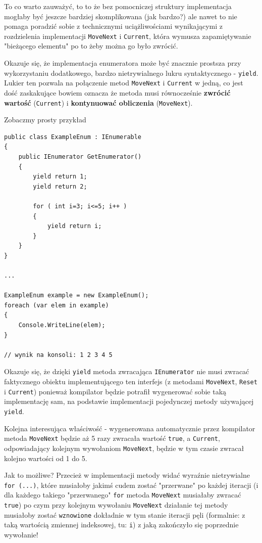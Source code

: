 To co warto zauważyć, to to że bez pomocniczej struktury implementacja mogłaby być jeszcze bardziej
skomplikowana (jak bardzo?) ale nawet to nie pomaga poradzić sobie z technicznymi uciążliwościami wynikającymi
z rozdzielenia implementacji {\tt MoveNext} i {\tt Current}, która wymusza zapamiętywanie "bieżącego elementu"
po to żeby można go było zwrócić.

Okazuje się, że implementacja enumeratora może być znacznie prostsza przy wykorzystaniu dodatkowego,
bardzo nietrywialnego lukru syntaktycznego - {\tt yield}. Lukier ten pozwala na połączenie
metod {\tt MoveNext} i {\tt Current} w jedną, co jest dość zaskakujące bowiem oznacza że metoda musi
równocześnie {\bf zwrócić wartość} ({\tt Current}) i {\bf kontynuować obliczenia} ({\tt MoveNext}). 

Zobaczmy prosty przykład

\begin{scriptsize}
\begin{verbatim}
public class ExampleEnum : IEnumerable
{
    public IEnumerator GetEnumerator()
    {
        yield return 1;
        yield return 2;

        for ( int i=3; i<=5; i++ )
        {
            yield return i;
        }
    }
}

...

ExampleEnum example = new ExampleEnum();
foreach (var elem in example)
{
    Console.WriteLine(elem);
}

// wynik na konsoli: 1 2 3 4 5 
\end{verbatim}
\end{scriptsize}

Okazuje się, że dzięki {\tt yield} metoda zwracająca {\tt IEnumerator} nie musi zwracać faktycznego
obiektu implementującego ten interfejs (z metodami {\tt MoveNext}, {\tt Reset} i {\tt Current}) ponieważ
kompilator będzie potrafił wygenerować sobie taką implementację sam, na podstawie implementacji pojedynczej metody
używającej {\tt yield}.

Kolejna interesująca właściwość - wygenerowana automatycznie przez kompilator metoda {\tt MoveNext} będzie
aż 5 razy zwracała wartość {\tt true}, a {\tt Current}, odpowiadający kolejnym wywołaniom {\tt MoveNext}, będzie
w tym czasie zwracał kolejno wartości od 1 do 5. 

Jak to możliwe? Przecież w implementacji metody widać wyraźnie nietrywialne {\tt for (...)}, które musiałoby 
jakimś cudem zostać "przerwane" po każdej iteracji (i dla każdego takiego "przerwanego" {\tt for} metoda
{\tt MoveNext} musiałaby zwracać {\tt true}) po czym przy kolejnym wywołaniu {\tt MoveNext} działanie
tej metody musiałoby zostać {\tt wznowione} dokładnie w tym stanie iteracji pęli (formalnie: z taką wartością
zmiennej indeksowej, tu: {\tt i}) z jaką zakończyło się poprzednie wywołanie!

